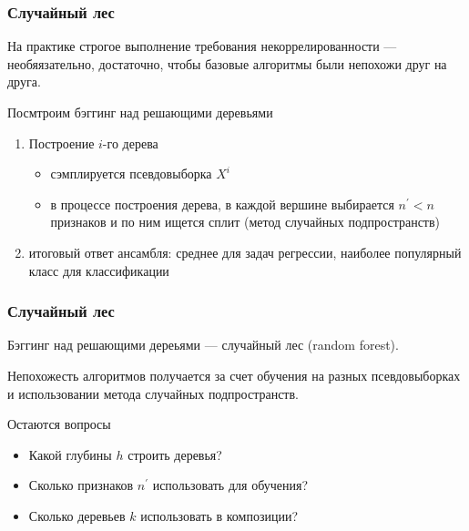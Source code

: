 \documentclass{beamer}
\begin{document}
	\begin{frame}
		\frametitle{Случайный лес}

		На практике строгое выполнение требования некоррелированности --- необяязательно,
		достаточно, чтобы базовые алгоритмы были непохожи друг на друга.

		\vspace{15pt}

		Посмтроим бэггинг над решающими деревьями
		\begin{enumerate}
			\item Построение $i$-го дерева
			\begin{itemize}
				\item сэмплируется псевдовыборка $X^i$
				\item в процессе построения дерева, в каждой вершине выбирается $n^{'} < n$ признаков и по ним ищется сплит
				(метод случайных подпространств)
			\end{itemize}
			\item итоговый ответ ансамбля: среднее для задач регрессии,
			наиболее популярный класс для классификации
		\end{enumerate}
	\end{frame}

	\begin{frame}
		\frametitle{Случайный лес}

		Бэггинг над решающими дереьями --- случайный лес (random forest).

		Непохожесть алгоритмов получается за счет обучения на разных псевдовыборках
		и использовании метода случайных подпространств.

		\vspace{15pt}

		Остаются вопросы
		\begin{itemize}
			\item Какой глубины $h$ строить деревья?
			\item Сколько признаков $n^{'}$ использовать для обучения?
			\item Сколько деревьев $k$ использовать в композиции?
		\end{itemize}
	\end{frame}
\end{document}
